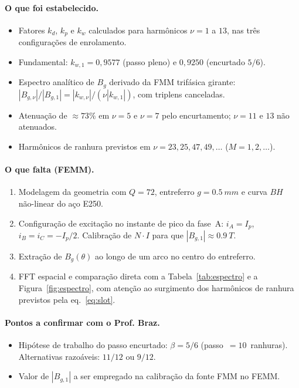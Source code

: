 \documentclass[12pt,a4paper]{article}
\begin{document}
\paragraph{O que foi estabelecido.}
\begin{itemize}
    \item Fatores $k_d$, $k_p$ e $k_w$ calculados para harmônicos $\nu = 1$ a $13$, nas três configurações de enrolamento.
    \item Fundamental: $k_{w,1}=0{,}9577$ (passo pleno) e $0{,}9250$ (encurtado $5/6$).
    \item Espectro analítico de $B_g$ derivado da FMM trifásica girante: $|B_{g,\nu}|/|B_{g,1}| = |k_{w,\nu}|/(\nu|k_{w,1}|)$, com triplens canceladas.
    \item Atenuação de $\approx 73\%$ em $\nu=5$ e $\nu=7$ pelo encurtamento; $\nu=11$ e $13$ não atenuados.
    \item Harmônicos de ranhura previstos em $\nu = 23, 25, 47, 49, \ldots$ ($M=1,2,\ldots$).
\end{itemize}

\paragraph{O que falta (FEMM).}
\begin{enumerate}
    \item Modelagem da geometria com $Q=72$, entreferro $g=\SI{0.5}{mm}$ e curva $BH$ não-linear do aço E250.
    \item Configuração de excitação no instante de pico da fase~A: $i_A=I_p$, $i_B=i_C=-I_p/2$. Calibração de $N\!\cdot\! I$ para que $|B_{g,1}|\approx \SI{0.9}{T}$.
    \item Extração de $B_g(\theta)$ ao longo de um arco no centro do entreferro.
    \item FFT espacial e comparação direta com a Tabela~\ref{tab:espectro} e a Figura~\ref{fig:espectro}, com atenção ao surgimento dos harmônicos de ranhura previstos pela eq.~\eqref{eq:slot}.
\end{enumerate}

\paragraph{Pontos a confirmar com o Prof. Braz.}
\begin{itemize}
    \item Hipótese de trabalho do passo encurtado: $\beta=5/6$ (\mbox{passo $=10$ ranhuras}). Alternativas razoáveis: $11/12$ ou $9/12$.
    \item Valor de $|B_{g,1}|$ a ser empregado na calibração da fonte FMM no FEMM.
\end{itemize}
\end{document}
